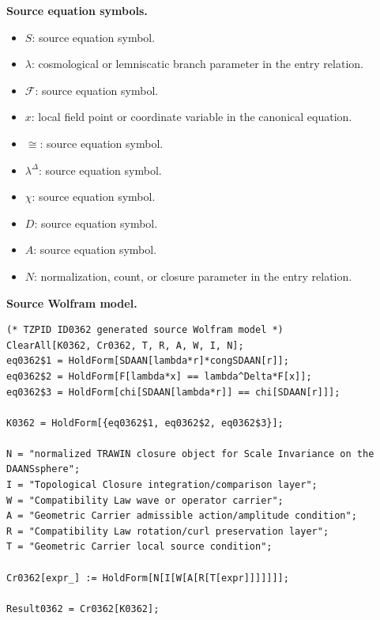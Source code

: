 \begin{minipage}[t]{0.49\linewidth}
\begingroup
\small
\raggedright
\textbf{Source equation symbols.}\par
\begin{itemize}[leftmargin=1.35em,itemsep=1pt,topsep=1pt,parsep=0pt]
    \item $S$: source equation symbol.
    \item $\lambda$: cosmological or lemniscatic branch parameter in the entry relation.
    \item $\mathcal{F}$: source equation symbol.
    \item $x$: local field point or coordinate variable in the canonical equation.
    \item $\cong$: source equation symbol.
    \item $\lambda^{\Delta}$: source equation symbol.
    \item $\chi$: source equation symbol.
    \item $D$: source equation symbol.
    \item $A$: source equation symbol.
    \item $N$: normalization, count, or closure parameter in the entry relation.
\end{itemize}
\endgroup
\end{minipage}\hfill
\begin{minipage}[t]{0.47\linewidth}
\begingroup
\scriptsize
\raggedright
\textbf{Source Wolfram model.}\par
\begin{Verbatim}[fontsize=\tiny,breaklines=true,breakanywhere=true]
(* TZPID ID0362 generated source Wolfram model *)
ClearAll[K0362, Cr0362, T, R, A, W, I, N];
eq0362$1 = HoldForm[SDAAN[lambda*r]*congSDAAN[r]];
eq0362$2 = HoldForm[F[lambda*x] == lambda^Delta*F[x]];
eq0362$3 = HoldForm[chi[SDAAN[lambda*r]] == chi[SDAAN[r]]];

K0362 = HoldForm[{eq0362$1, eq0362$2, eq0362$3}];

N = "normalized TRAWIN closure object for Scale Invariance on the DAANSsphere";
I = "Topological Closure integration/comparison layer";
W = "Compatibility Law wave or operator carrier";
A = "Geometric Carrier admissible action/amplitude condition";
R = "Compatibility Law rotation/curl preservation layer";
T = "Geometric Carrier local source condition";

Cr0362[expr_] := HoldForm[N[I[W[A[R[T[expr]]]]]]];

Result0362 = Cr0362[K0362];
\end{Verbatim}
\endgroup
\end{minipage}

